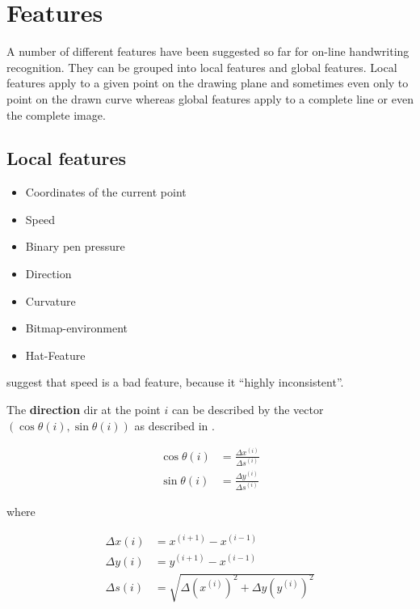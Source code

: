 \section{Features}\label{sec:features}
A number of different features have been suggested so far for on-line handwriting
recognition. They can be grouped into local features and global features.
Local features apply to a given point on the drawing plane and sometimes even
only to point on the drawn curve whereas global features apply to a complete
line or even the complete image.

\subsection{Local features}
\begin{itemize}
    \item Coordinates of the current point\cite{Guyon91}
    \item Speed\cite{Huang09,ICASSP-94}
    \item Binary pen pressure\cite{Kosmala98,Kosmala11,ICASSP-94}
    \item Direction\cite{Manke95,Huang06}
    \item Curvature\cite{Groner66,Manke95,ICASSP-94,Guyon91}
    \item Bitmap-environment\cite{Manke95}
    \item Hat-Feature\cite{ICASSP-94,Manke00}
\end{itemize}

\cite{Kosmala98,Kosmala11} suggest that speed is a bad feature, because it \enquote{highly inconsistent}.

The \textbf{direction} $\text{dir}$ at the point $i$ can be described by the vector 
$(\cos \theta(i), \sin \theta(i))$ as described in \cite{Guyon91}.

\begin{align}
    \cos \theta(i) &= \frac{\Delta x^{(i)}}{\Delta s^{(i)}}\\
    \sin \theta(i) &= \frac{\Delta y^{(i)}}{\Delta s^{(i)}}
\end{align}

where

\begin{align}
    \Delta x (i) &= x^{(i+1)} - x^{(i-1)}\\
    \Delta y (i) &= y^{(i+1)} - x^{(i-1)}\\
    \Delta s (i) &= \sqrt{\Delta (x^{(i)})^2 + \Delta y (y^{(i)})^2}
\end{align}


